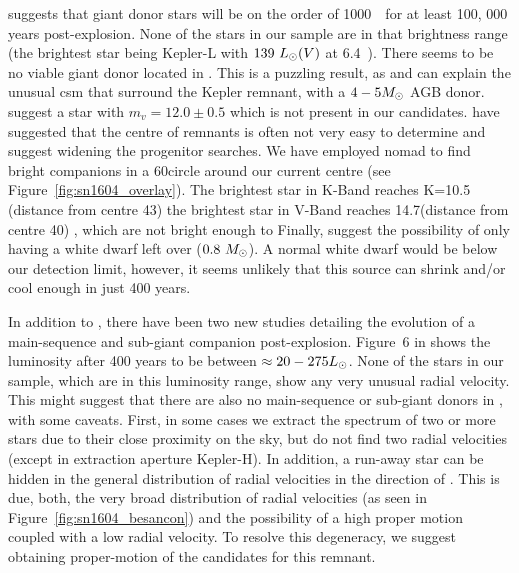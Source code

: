 \documentclass[preprint2]{aastex}
\begin{document}
\citet{2000ApJS..128..615M} suggests that giant donor stars will be on the order of 1000~\lsun\  for at least 100, 000 years post-explosion. None of the stars in our sample are in that brightness range (the brightest star being Kepler-L with $139~\hbox{$L_{\odot}$}(V)$ at 6.4~\kpc). There seems to be no viable giant donor located in . This is a puzzling result, as \citet{2012A&A...537A.139C} and \citet{2013ApJ...764...63B} can explain the unusual \gls{csm} that surround the Kepler remnant, with a $4 - 5 \hbox{$M_{\odot}$}$ AGB donor. \citet{2012A&A...537A.139C} suggest a star with $m_v=12.0 \pm 0.5$ which is not present in our candidates.  \cite{2013arXiv1305.0567W} have suggested that the centre of remnants is often not very easy to determine and suggest widening the progenitor searches. We have employed \gls{nomad} to find bright companions in a 60\arcsec circle around our current centre (see Figure~\ref{fig:sn1604_overlay}). The brightest star in K-Band reaches K=10.5 (distance from centre 43\arcsec)  the brightest star in V-Band reaches 14.7(distance from centre 40\arcsec) , which are not bright enough to  Finally, \citet{2012A&A...537A.139C}  suggest the possibility of only having a white dwarf left over ($0.8~\hbox{$M_{\odot}$}$).  A normal white dwarf would be below our detection limit, however, it seems unlikely that this source can shrink and/or cool enough in just 400 years.


In addition to \citet{2000ApJS..128..615M}, there have been two new studies \citep{2012arXiv1205.5028S,2012ApJ...760...21P} detailing the evolution of a main-sequence and sub-giant companion post-explosion. Figure~6 in \citep{2012ApJ...760...21P} shows the luminosity after 400 years to be between $\approx 20 - 275 \hbox{$L_{\odot}$}$. None of the stars in our sample, which are in this luminosity range, show any very unusual radial velocity. This might suggest that there are also no main-sequence or sub-giant donors in , with some caveats. First, in some cases we extract the spectrum of two or more stars due to their close proximity on the sky, but do not find two radial velocities (except in extraction aperture Kepler-H). In addition, a run-away star can be hidden in the general distribution of radial velocities in the direction of . This is due, both, the very broad distribution of radial velocities (as seen in Figure~\ref{fig:sn1604_besancon}) and the possibility of a high proper motion coupled with a low radial velocity. To resolve this degeneracy, we suggest obtaining proper-motion of the candidates for this remnant. 
\end{document}
